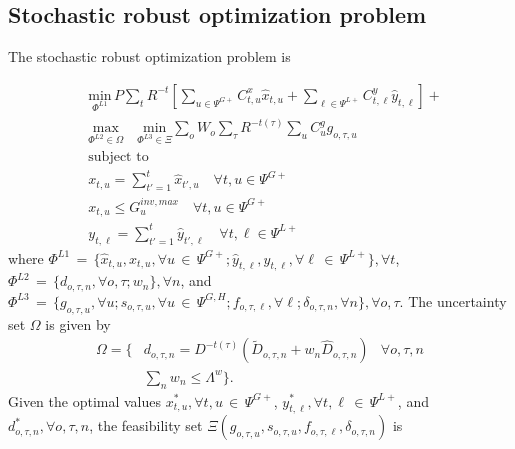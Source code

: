 \documentclass[final]{IEEEtran}
\newcommand{\myin}{\,{\in}\,}
\newcommand{\myeq}{\,{=}\,}
\begin{document}
\subsection{Stochastic robust optimization problem}

The stochastic robust optimization problem is

\begin{align}
&\underset{\Phi^{L1}}{\text{min}} \, P \sum\limits_{t} R^{-t} \left[ \sum\limits_{u \in \Psi^{G+}} C^x_{t, u} \hat{x}_{t, u} + \sum\limits_{\ell \in \Psi^{L+}} C^y_{t, \ell} \hat{y}_{t, \ell} \right] + \nonumber \\
&\label{saro_obj}\underset{\Phi^{L2} \in \Omega}{\text{max}} \quad \underset{\Phi^{L3} \in \Xi}{\text{min}} \sum\limits_o W_o \sum\limits_{\tau} R^{-t(\tau)} \sum\limits_{u} C^g_{u} g_{o, \tau, u} \\
&\text{subject to} \nonumber \\
&\label{master_constraint_first} x_{t, u} = \sum\limits_{t' = 1}^{t} \hat{x}_{t', u} 	\quad \forall t, u \in \Psi^{G+} \\
&x_{t, u} \leq G^{inv, max}_u \quad \forall t, u \in \Psi^{G+} \\
&\label{master_constraint_last} y_{t, \ell} = \sum\limits_{t' = 1}^{t} \hat{y}_{t', \ell} 	\quad \forall t, \ell \in \Psi^{L+}
\end{align}
where \( \Phi^{L1} \myeq \{ \hat{x}_{t, u}, x_{t, u}, \forall u \myin \Psi^{G+}; \hat{y}_{t, \ell}, y_{t, \ell}, \forall \ell \myin \Psi^{L+} \}, \forall t \), \( \Phi^{L2} \myeq \{ d_{o, \tau, n}, \forall o, \tau; w_{n} \}, \forall n \), and \( \Phi^{L3} \myeq \{ g_{o, \tau, u}, \forall u; s_{o, \tau, u}, \forall u \myin \Psi^{G, H}; f_{o, \tau, \ell}, \forall \ell; \delta_{o, \tau, n}, \forall n \}, \forall o, \tau \). The uncertainty set $\Omega$ is given by
\begin{align}
\Omega = \{ &d_{o, \tau, n} = D^{-t(\tau)} (\tilde{D}_{o, \tau, n} + w_n \hat{D}_{o, \tau, n}) & \forall o, \tau, n \nonumber \\
&\label{uncertainty_set}\sum\limits_n w_{n} \leq \Lambda^w \}.
\end{align}
Given the optimal values \( x_{t, u}^*, \forall t, u \myin \Psi^{G+} \), \( y_{t, \ell}^*, \forall t, \ell \myin \Psi^{L+} \), and \( d_{o, \tau, n}^*, \forall o, \tau, n \), the feasibility set \( \Xi(g_{o, \tau, u}, s_{o, \tau, u}, f_{o, \tau, \ell}, \delta_{o, \tau, n}) \) is
\end{document}

